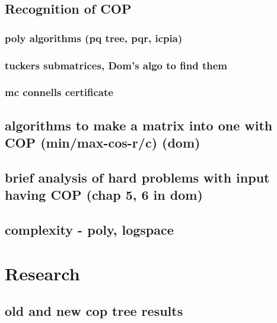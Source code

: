\section{Recognition of COP}
\subsection{poly algorithms (pq tree, pqr, icpia)}
\subsection{tuckers submatrices, Dom's algo to find them}
\subsection{mc connells certificate}
\section{algorithms to make a matrix into one with COP (min/max-cos-r/c) (dom)}
\section{brief analysis of hard problems with input having COP (chap 5, 6 in dom)}
\section{complexity - poly, logspace}

\chapter{Research}
\section{old and new cop tree results}







